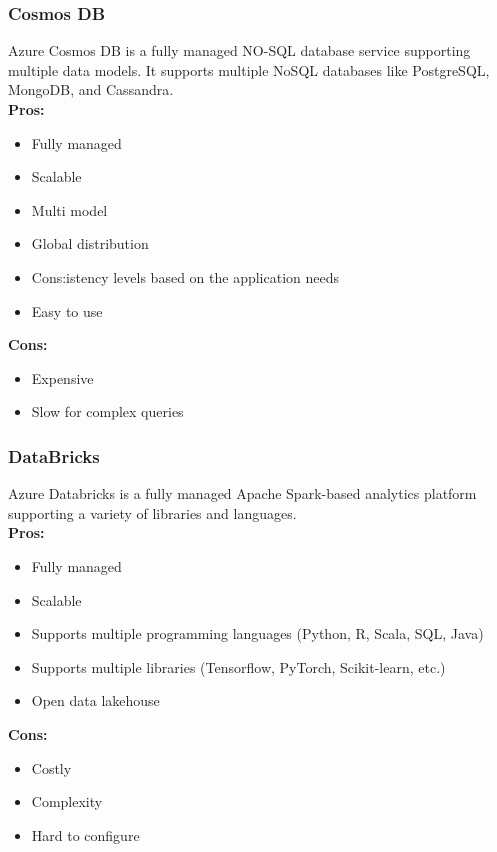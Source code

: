         \subsubsection{Cosmos DB}
        \label{azure:cosmos-db}
        Azure Cosmos DB is a fully managed NO-SQL database service supporting multiple data models. It supports multiple NoSQL databases like PostgreSQL, MongoDB, and Cassandra.\\
        \textbf{Pros:}
        \begin{itemize}
            \item Fully managed
            \item Scalable
            \item Multi model
            \item Global distribution
            \item Cons:istency levels based on the application needs
            \item Easy to use
        \end{itemize}
        \textbf{Cons:}
        \begin{itemize}
            \item Expensive
            \item Slow for complex queries
        \end{itemize}

        \subsubsection{DataBricks}
        \label{azure:databricks}
        Azure Databricks is a fully managed Apache Spark-based analytics platform supporting a variety of libraries and languages.\\
        \textbf{Pros:}
        \begin{itemize}
            \item Fully managed
            \item Scalable
            \item Supports multiple programming languages (Python, R, Scala, SQL, Java)
            \item Supports multiple libraries (Tensorflow, PyTorch, Scikit-learn, etc.)
            \item Open data lakehouse
        \end{itemize}
        \textbf{Cons:}
        \begin{itemize}
            \item Costly
            \item Complexity
            \item Hard to configure
        \end{itemize}

